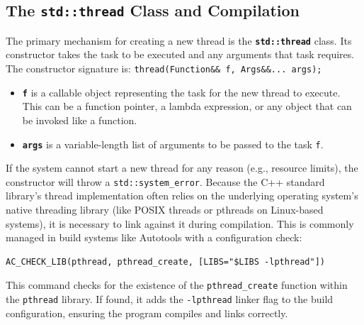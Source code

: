 \documentclass{article} %
\begin{document}
\subsection{The \texttt{std::thread} Class and Compilation}
The primary mechanism for creating a new thread is the \textbf{\texttt{std::thread}} class. Its constructor takes the task to be executed and any arguments that task requires.
The constructor signature is: \texttt{thread(Function\&\& f, Args\&\&... args);}
\begin{itemize}
    \item \textbf{\texttt{f}} is a callable object representing the task for the new thread to execute. This can be a function pointer, a lambda expression, or any object that can be invoked like a function.
    \item \textbf{\texttt{args}} is a variable-length list of arguments to be passed to the task \texttt{f}.
\end{itemize}
If the system cannot start a new thread for any reason (e.g., resource limits), the constructor will throw a \texttt{std::system\_error}.
Because the C++ standard library's thread implementation often relies on the underlying operating system's native threading library (like POSIX threads or pthreads on Linux-based systems), it is necessary to link against it during compilation. This is commonly managed in build systems like Autotools with a configuration check:
\begin{verbatim}
AC_CHECK_LIB(pthread, pthread_create, [LIBS="$LIBS -lpthread"])
\end{verbatim}
This command checks for the existence of the \texttt{pthread\_create} function within the \texttt{pthread} library. If found, it adds the \texttt{-lpthread} linker flag to the build configuration, ensuring the program compiles and links correctly.
\end{document}

